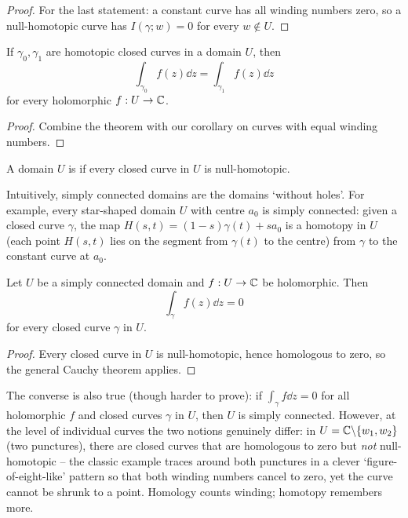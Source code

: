 \documentclass[a4paper]{scrartcl}
\begin{document}
\begin{proof}
    For the last statement: a constant curve has all winding numbers zero, so a null-homotopic curve has $I(\gamma; w) = 0$ for every $w \notin U$.
\end{proof}

\begin{corollary}
    If $\gamma_0, \gamma_1$ are homotopic closed curves in a domain $U$, then
    $$
    \int_{\gamma_0} f(z) \dd z = \int_{\gamma_1} f(z) \dd z
    $$
    for every holomorphic $f: U \rightarrow \mathbb{C}$.
\end{corollary}
\begin{proof}
    Combine the theorem with our corollary on curves with equal winding numbers.
\end{proof}

\begin{definition}
    A domain $U$ is  if every closed curve in $U$ is null-homotopic.
\end{definition}

Intuitively, simply connected domains are the domains `without holes'. For example, every star-shaped domain $U$ with centre $a_0$ is simply connected: given a closed curve $\gamma$, the map $H(s, t) = (1 - s)\gamma(t) + s a_0$ is a homotopy in $U$ (each point $H(s,t)$ lies on the segment from $\gamma(t)$ to the centre) from $\gamma$ to the constant curve at $a_0$.

\begin{theorem}
    Let $U$ be a simply connected domain and $f: U \rightarrow \mathbb{C}$ be holomorphic. Then
    $$
    \int_\gamma f(z) \dd z = 0
    $$
    for every closed curve $\gamma$ in $U$.
\end{theorem}
\begin{proof}
    Every closed curve in $U$ is null-homotopic, hence homologous to zero, so the general Cauchy theorem applies.
\end{proof}

\begin{remark}
    The converse is also true (though harder to prove): if $\int_\gamma f \dd z = 0$ for all holomorphic $f$ and closed curves $\gamma$ in $U$, then $U$ is simply connected. However, at the level of individual curves the two notions genuinely differ: in $U = \mathbb{C} \backslash \{w_1, w_2\}$ (two punctures), there are closed curves that are homologous to zero but \emph{not} null-homotopic -- the classic example traces around both punctures in a clever `figure-of-eight-like' pattern so that both winding numbers cancel to zero, yet the curve cannot be shrunk to a point. Homology counts winding; homotopy remembers more.
\end{remark}
\end{document}
